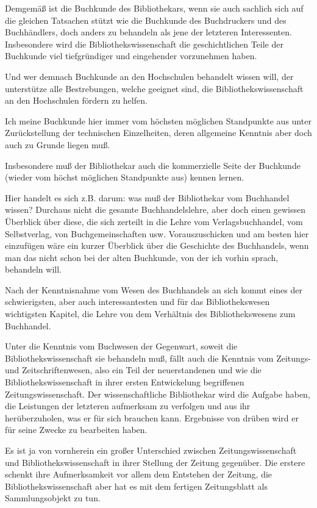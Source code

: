 \documentclass[a4paper,
fontsize=11pt,
oneside,
numbers=noperiodatend,
parskip=half-,
bibliography=totoc,
final
]{scrartcl}
\begin{document}
Demgemäß ist die Buchkunde des Bibliothekars, wenn sie auch sachlich
sich auf die gleichen Tatsachen stützt wie die Buchkunde des
Buchdruckers und des Buchhändlers, doch anders zu behandeln als jene der
letzteren Interessenten. Insbesondere wird die Bibliothekswissenschaft
die geschichtlichen Teile der Buchkunde viel tiefgründiger und
eingehender vorzunehmen haben.

Und wer demnach Buchkunde an den Hochschulen behandelt wissen will, der
unterstütze alle Bestrebungen, welche geeignet sind, die
Bibliothekswissenschaft an den Hochschulen fördern zu helfen.

Ich meine Buchkunde hier immer vom höchsten möglichen Standpunkte aus
unter Zurückstellung der technischen Einzelheiten, deren allgemeine
Kenntnis aber doch auch zu Grunde liegen muß.

Insbesondere muß der Bibliothekar auch die kommerzielle Seite der
Buchkunde (wieder vom höchst möglichen Standpunkte aus) kennen lernen.

Hier handelt es sich z.B. darum: was muß der Bibliothekar vom Buchhandel
wissen? Durchaus nicht die gesamte Buchhandelslehre, aber doch einen
gewissen Überblick über diese, die sich zerteilt in die Lehre vom
Verlagsbuchhandel, vom Selbstverlag, von Buchgemeinschaften usw.
Vorauszuschicken und am besten hier einzufügen wäre ein kurzer Überblick
über die Geschichte des Buchhandels, wenn man das nicht schon bei der
alten Buchkunde, von der ich vorhin sprach, behandeln will.

Nach der Kenntnisnahme vom Wesen des Buchhandels an sich kommt eines der
schwierigsten, aber auch interessantesten und für das Bibliothekswesen
wichtigsten Kapitel, die Lehre von dem Verhältnis des Bibliothekswesens
zum Buchhandel.

Unter die Kenntnis vom Buchwesen der Gegenwart, soweit die
Bibliothekswissenschaft sie behandeln muß, fällt auch die Kenntnis vom
Zeitungs- und Zeitschriftenwesen, also ein Teil der neuerstandenen und
wie die Bibliothekswissenschaft in ihrer ersten Entwickelung begriffenen
Zeitungswissenschaft. Der wissenschaftliche Bibliothekar wird die
Aufgabe haben, die Leistungen der letzteren aufmerksam zu verfolgen und
aus ihr herüberzuholen, was er für sich brauchen kann. Ergebnisse von
drüben wird er für seine Zwecke zu bearbeiten haben.

Es ist ja von vornherein ein großer Unterschied zwischen
Zeitungswissenschaft und Bibliothekswissenschaft in ihrer Stellung der
Zeitung gegenüber. Die erstere schenkt ihre Aufmerksamkeit vor allem dem
Entstehen der Zeitung, die Bibliothekswissenschaft aber hat es mit dem
fertigen Zeitungsblatt als Sammlungsobjekt zu tun.
\end{document}
